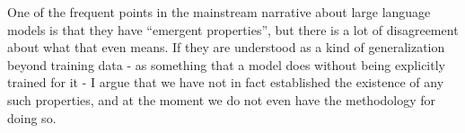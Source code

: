 One of the frequent points in the mainstream narrative about large language models is that they have ``emergent properties'', but there is a lot of disagreement about what that even means. If they are understood as a kind of generalization beyond training data - as something that a model does without being explicitly trained for it - I argue that we have not in fact established the existence of any such properties, and at the moment we do not even have the methodology for doing so.